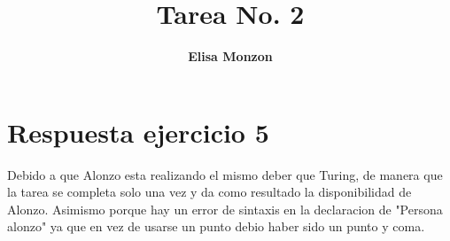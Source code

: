 \documentclass{article}
\author{\textbf{Elisa Monzon}}
\title{Tarea No. 2}
\begin{document}
\maketitle

\section{Respuesta ejercicio 5}

Debido a que Alonzo esta realizando el mismo deber que Turing, de manera que la tarea se completa solo una vez y da como resultado la disponibilidad de Alonzo.
Asimismo porque hay un error de sintaxis en la declaracion de "Persona alonzo" ya que en vez de usarse un punto debio haber sido un punto y coma.
\end{document}
